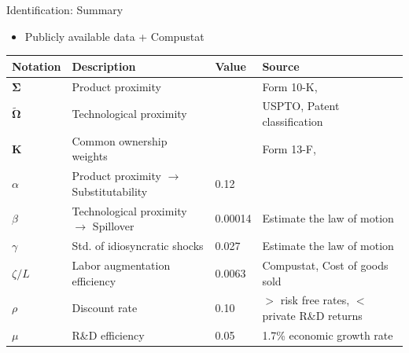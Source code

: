 \documentclass[
  10pt,
  aspectratio=169,   %
]{beamer}
\theoremstyle{plain}
\begin{document}
\begin{frame}{Identification: Summary}
  \begin{itemize}
    \item Publicly available data + Compustat
  \end{itemize}
  \begin{table}[h]
    \centering
    \small %
    \begin{tabular}{llll}
      \toprule
      Notation                           & Description                                      & Value   & Source                                   \\
      \midrule
      $\bm{\Sigma}$                   & Product proximity                                &         & Form 10-K, \citet{Hoberg2016-jm}          \\
      $\bm{\widetilde{\Omega}}$       & Technological proximity                          &         & USPTO, Patent classification             \\
      $\bm{K}$                        & Common ownership weights                         &         & Form 13-F, \citet{Backus2021-yt}          \\
      $\alpha$                           & Product proximity $\rightarrow$ Substitutability & 0.12    & \citet{Pellegrino2024-dn}                \\
      $\beta$                            & Technological proximity $\rightarrow$ Spillover  & 0.00014 & Estimate the law of motion               \\
      $\gamma$                           & Std. of idiosyncratic shocks                    & 0.027   & Estimate the law of motion               \\
      $\zeta/L$                          & Labor augmentation efficiency                    & 0.0063  & Compustat, Cost of goods sold            \\
      $\rho$                             & Discount rate                                    & 0.10    & $>$ risk free rates, $<$ private R\&D returns \\
      $\mu$                              & R\&D efficiency                                  & 0.05    & 1.7\% economic growth rate               \\
      \bottomrule
    \end{tabular}
  \end{table}
\end{frame}
\end{document}
